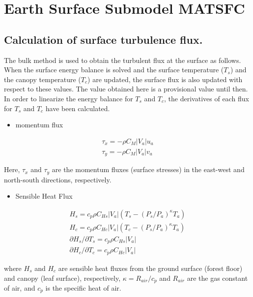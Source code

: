 \hypertarget{earth-surface-submodel-matsfc}{%
\section{Earth Surface Submodel
MATSFC}\label{earth-surface-submodel-matsfc}}

\hypertarget{calculation-of-surface-turbulence-flux.}{%
\subsection{Calculation of surface turbulence
flux.}\label{calculation-of-surface-turbulence-flux.}}

The bulk method is used to obtain the turbulent flux at the surface as
follows. When the surface energy balance is solved and the surface
temperature (\(T_s\)) and the canopy temperature (\(T_c\)) are updated,
the surface flux is also updated with respect to these values. The value
obtained here is a provisional value until then. In order to linearize
the energy balance for \(T_s\) and \(T_c\), the derivatives of each flux
for \(T_s\) and \(T_c\) have been calculated.

\begin{itemize}
\tightlist
\item
  momentum flux
\end{itemize}

\begin{eqnarray}
 \tau_x = - \rho C_{M}|V_a| u_a \\
 \tau_y = - \rho C_{M}|V_a| v_a
\end{eqnarray}

Here, \(\tau_x\) and \(\tau_y\) are the momentum fluxes (surface
stresses) in the east-west and north-south directions, respectively.

\begin{itemize}
\tightlist
\item
  Sensible Heat Flux
\end{itemize}

\begin{eqnarray}
 H_s = c_p \rho C_{Hs}|V_a| (T_s - (P_s/P_a)^{\kappa}T_a)
  \\
 H_c = c_p \rho C_{Hc}|V_a| (T_c - (P_s/P_a)^{\kappa}T_a) \\
 \partial H_s/\partial T_s = c_p \rho C_{Hs}|V_a| \\
 \partial H_c/\partial T_c = c_p \rho C_{Hc}|V_a|
\end{eqnarray}

where \(H_s\) and \(H_c\) are sensible heat fluxes from the ground
surface (forest floor) and canopy (leaf surface), respectively,
\(\kappa = R_{air} / c_p\) and \(R_{air}\) are the gas constant of air,
and \(c_p\) is the specific heat of air.


